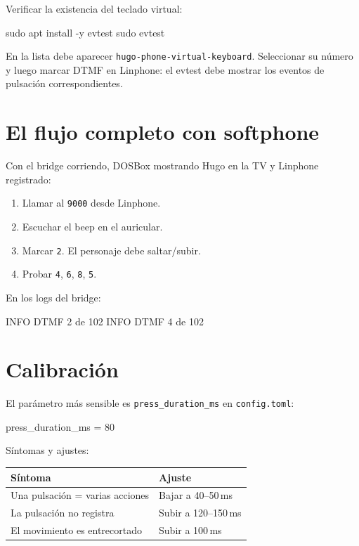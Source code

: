 Verificar la existencia del teclado virtual:

\begin{shellcode}
sudo apt install -y evtest
sudo evtest
\end{shellcode}

En la lista debe aparecer \texttt{hugo-phone-virtual-keyboard}. Seleccionar su número y luego marcar DTMF en Linphone: el evtest debe mostrar los eventos de pulsación correspondientes.

\section{El flujo completo con softphone}

Con el bridge corriendo, DOSBox mostrando Hugo en la TV y Linphone registrado:

\begin{enumerate}
  \item Llamar al \texttt{9000} desde Linphone.
  \item Escuchar el beep en el auricular.
  \item Marcar \texttt{2}. El personaje debe saltar/subir.
  \item Probar \texttt{4}, \texttt{6}, \texttt{8}, \texttt{5}.
\end{enumerate}

En los logs del bridge:

\begin{plaincode}
INFO DTMF 2 de 102
INFO DTMF 4 de 102
\end{plaincode}

\section{Calibración}

El parámetro más sensible es \texttt{press\_duration\_ms} en \texttt{config.toml}:

\begin{tomlcode}
[bridge]
press_duration_ms = 80
\end{tomlcode}

Síntomas y ajustes:

\begin{table}[h]
\centering
\begin{tabular}{ll}
\toprule
\textbf{Síntoma} & \textbf{Ajuste} \\
\midrule
Una pulsación = varias acciones & Bajar a 40--50\,ms \\
La pulsación no registra & Subir a 120--150\,ms \\
El movimiento es entrecortado & Subir a 100\,ms \\
\bottomrule
\end{tabular}
\end{table}

